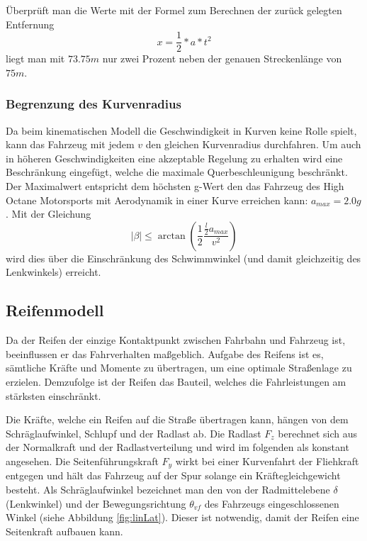\documentclass{like}
\begin{document}
Überprüft man die Werte mit der Formel zum Berechnen der zurück gelegten Entfernung 
\begin{equation}
x = \frac{1}{2} * a * t^2  
\end{equation}
liegt man mit \(73.75m\) nur zwei Prozent neben der genauen Streckenlänge von \(75m\).

\subsubsection*{Begrenzung des Kurvenradius}
\label{betaMax}
Da beim kinematischen Modell die Geschwindigkeit in Kurven keine Rolle spielt, kann das Fahrzeug mit jedem \(v\) den gleichen Kurvenradius durchfahren. Um auch in höheren Geschwindigkeiten eine akzeptable Regelung zu erhalten wird eine Beschränkung eingefügt, welche die maximale Querbeschleunigung beschränkt. Der Maximalwert entspricht dem höchsten g-Wert den das Fahrzeug des High Octane Motorsports mit Aerodynamik in einer Kurve erreichen kann: $a_{max} = 2.0g$. 
Mit der Gleichung
\begin{equation}
	|\beta| \leq \arctan(\frac{1}{2} \frac{\frac{l}{2} a_{max}}{v^2})
\end{equation}
wird dies über die Einschränkung des Schwimmwinkel (und damit gleichzeitig des Lenkwinkels) erreicht.


\subsection{Reifenmodell}
\label{tireModel}
Da der Reifen der einzige Kontaktpunkt zwischen Fahrbahn und Fahrzeug ist,  beeinflussen er das Fahrverhalten maßgeblich. Aufgabe des Reifens ist es, sämtliche Kräfte und Momente zu übertragen, um eine optimale Straßenlage zu erzielen. Demzufolge ist der Reifen das Bauteil, welches die Fahrleistungen am stärksten einschränkt.

Die Kräfte, welche ein Reifen auf die Straße übertragen kann, hängen von dem Schräglaufwinkel, Schlupf und der Radlast ab. Die Radlast \(F_z\) berechnet sich aus der Normalkraft und der Radlastverteilung und wird im folgenden als konstant angesehen.
Die Seitenführungskraft \(F_y\) wirkt bei einer Kurvenfahrt der Fliehkraft entgegen und hält das Fahrzeug auf der Spur solange ein Kräftegleichgewicht besteht. Als Schräglaufwinkel bezeichnet man den von der Radmittelebene \(\delta\) (Lenkwinkel) und der Bewegungsrichtung \(\theta_{vf}\) des Fahrzeugs eingeschlossenen Winkel (siehe Abbildung \ref{fig:linLat}). Dieser ist notwendig, damit der Reifen eine Seitenkraft aufbauen kann. \\
\end{document}
